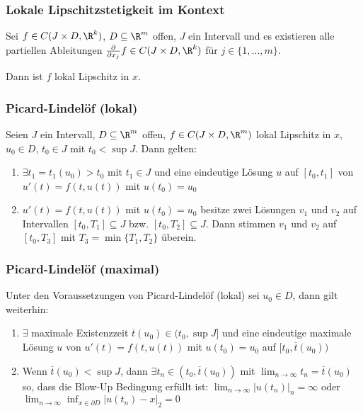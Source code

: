 \subsubsection*{Lokale Lipschitzstetigkeit im Kontext}

Sei $f \in C(J \times D, \R^k)$, $D \subseteq \R^m$ offen, $J$ ein Intervall und es existieren alle partiellen Ableitungen $\frac{\partial}{\partial x_j} f \in C(J \times D, \R^k)$ für $j \in \{1, \hdots, m\}$.

Dann ist $f$ lokal Lipschitz in $x$.

\subsubsection*{Picard-Lindelöf (lokal)}

Seien $J$ ein Intervall, $D \subseteq \R^m$ offen, $f \in C(J \times D, \R^m)$ lokal Lipschitz in $x$, $u_0 \in D$, $t_0 \in J$ mit $t_0 < \sup J$. Dann gelten:

\begin{enumerate}[label=(\alph*)]
	\item $\exists t_1 = t_1(u_0) > t_0 $ mit $t_1 \in J$ und eine eindeutige Lösung $u$  auf $[t_0, t_1]$ von $u'(t) = f(t, u(t))$ mit $u(t_0) = u_0$
	\item $u'(t) = f(t, u(t))$ mit $u(t_0) = u_0$ besitze zwei Lösungen $v_1$ und $v_2$ auf Intervallen $[t_0, T_1] \subseteq J$ bzw. $[t_0, T_2] \subseteq J$. Dann stimmen $v_1$ und $v_2$ auf $[t_0, T_3]$ mit $T_3 = \min\{T_1, T_2\}$ überein.
\end{enumerate}

\subsubsection*{Picard-Lindelöf (maximal)}

Unter den Voraussetzungen von Picard-Lindelöf (lokal) sei $u_0 \in D$, dann gilt weiterhin:

\begin{enumerate}[label=(\alph*)]
	\item $\exists$ maximale Existenzzeit $\overline t(u_0) \in (t_0, \sup J]$ und eine eindeutige maximale Lösung $u$ von $u'(t) = f(t, u(t))$ mit $u(t_0) = u_0$ auf $[t_0, \overline t(u_0))$
	\item Wenn $\overline t(u_0) < \sup J$, dann $\exists t_n \in (t_0, \overline t(u_0))$ mit $\lim_{n \to \infty} t_n = \overline t(u_0)$ so, dass die Blow-Up Bedingung erfüllt ist: $\lim_{n \to \infty} |u(t_n)|_n = \infty$ oder $\lim_{n \to \infty} \inf_{x \in \partial D} |u(t_n) - x|_2 = 0$
\end{enumerate}

